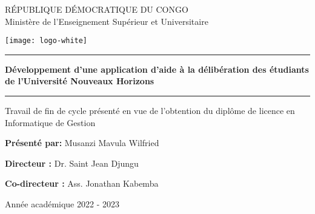 \begin{center}
    \uppercase{République Démocratique du Congo} \\ \vspace*{0.2cm}
    Ministère de l'Enseignement Supérieur et Universitaire \\ \vspace*{0.4cm}

    \texttt{[image: logo-white]}

    \vspace{3cm}
    \hrule
    \vspace{0.6cm}
    \large{\textbf{Développement d'une application d'aide à la délibération des étudiants de l'Université Nouveaux Horizons}}
    \vspace{0.6cm}
    \hrule

    \vspace{3cm}
    Travail de fin de cycle présenté en vue de l'obtention du diplôme de licence en Informatique de Gestion

    \vspace{4cm}
    \textbf{Présenté par:} Musanzi Mavula Wilfried

    \vspace{0.8cm}
    \textbf{Directeur :} Dr. Saint Jean Djungu

    \textbf{Co-directeur :} Ass. Jonathan Kabemba

    \vfill
    Année académique 2022 - 2023
\end{center}




